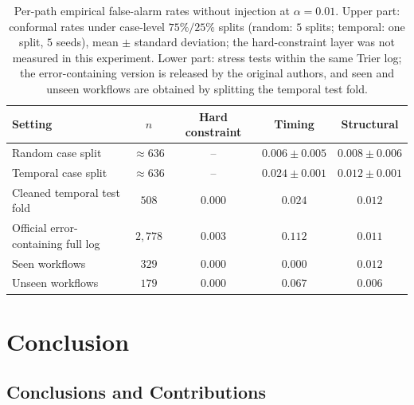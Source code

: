\documentclass[manuscript,screen,review]{acmart}
\begin{document}
\begin{table}[!t]
\renewcommand{\arraystretch}{1.12}
\caption{Per-path empirical false-alarm rates without injection at $\alpha=0.01$. Upper part: conformal rates under case-level $75\%/25\%$ splits (random: $5$ splits; temporal: one split, $5$ seeds), mean $\pm$ standard deviation; the hard-constraint layer was not measured in this experiment. Lower part: stress tests within the same {Trier} log; the error-containing version is released by the original authors, and seen and unseen workflows are obtained by splitting the temporal test fold.}
\label{tab:shift}
\label{tab:fprsplit}
\label{tab:cprime}
\label{tab:e9}
\centering
\small
\begin{tabular}{lcccc}
\toprule
Setting & $n$ & Hard constraint & Timing & Structural \\
\midrule
Random case split & ${\approx}636$ & -- & $0.006{\pm}0.005$ & $0.008{\pm}0.006$ \\
Temporal case split & ${\approx}636$ & -- & $0.024{\pm}0.001$ & $0.012{\pm}0.001$ \\
\midrule
Cleaned temporal test fold & $508$ & $0.000$ & $0.024$ & $0.012$ \\
Official error-containing full log & $2{,}778$ & $0.003$ & $0.112$ & $0.011$ \\
Seen workflows & $329$ & $0.000$ & $0.000$ & $0.012$ \\
Unseen workflows & $179$ & $0.000$ & $0.067$ & $0.006$ \\
\bottomrule
\end{tabular}
\end{table}

\section{Conclusion}
\label{sec:conclusion}

\subsection{Conclusions and Contributions}
\label{sec:contributions}
\end{document}
